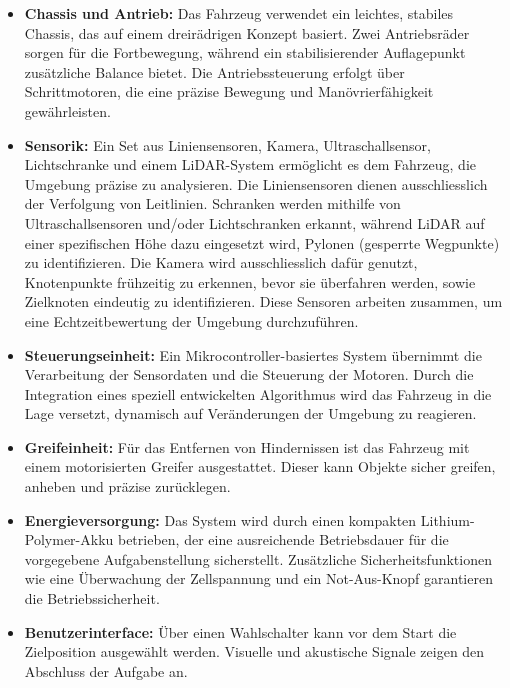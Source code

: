 \documentclass[main.tex]{subfiles} %
\begin{document}
\begin{itemize}
    \item \textbf{Chassis und Antrieb:} Das Fahrzeug verwendet ein leichtes, stabiles Chassis, das auf einem dreirädrigen Konzept basiert. Zwei Antriebsräder sorgen für die Fortbewegung, während ein stabilisierender Auflagepunkt zusätzliche Balance bietet. Die Antriebssteuerung erfolgt über Schrittmotoren, die eine präzise Bewegung und Manövrierfähigkeit gewährleisten.

    \item \textbf{Sensorik:} Ein Set aus Liniensensoren, Kamera, Ultraschallsensor, Lichtschranke und einem LiDAR-System ermöglicht es dem Fahrzeug, die Umgebung präzise zu analysieren. Die Liniensensoren dienen ausschliesslich der Verfolgung von Leitlinien. Schranken werden mithilfe von Ultraschallsensoren und/oder Lichtschranken erkannt, während LiDAR auf einer spezifischen Höhe dazu eingesetzt wird, Pylonen (gesperrte Wegpunkte) zu identifizieren. Die Kamera wird ausschliesslich dafür genutzt, Knotenpunkte frühzeitig zu erkennen, bevor sie überfahren werden, sowie Zielknoten eindeutig zu identifizieren. Diese Sensoren arbeiten zusammen, um eine Echtzeitbewertung der Umgebung durchzuführen.

    \item \textbf{Steuerungseinheit:} Ein Mikrocontroller-basiertes System übernimmt die Verarbeitung der Sensordaten und die Steuerung der Motoren. Durch die Integration eines speziell entwickelten Algorithmus wird das Fahrzeug in die Lage versetzt, dynamisch auf Veränderungen der Umgebung zu reagieren.

    \item \textbf{Greifeinheit:} Für das Entfernen von Hindernissen ist das Fahrzeug mit einem motorisierten Greifer ausgestattet. Dieser kann Objekte sicher greifen, anheben und präzise zurücklegen.

    \item \textbf{Energieversorgung:} Das System wird durch einen kompakten Lithium-Polymer-Akku betrieben, der eine ausreichende Betriebsdauer für die vorgegebene Aufgabenstellung sicherstellt. Zusätzliche Sicherheitsfunktionen wie eine Überwachung der Zellspannung und ein Not-Aus-Knopf garantieren die Betriebssicherheit.

    \item \textbf{Benutzerinterface:} Über einen Wahlschalter kann vor dem Start die Zielposition ausgewählt werden. Visuelle und akustische Signale zeigen den Abschluss der Aufgabe an.


\end{itemize}
\end{document}
